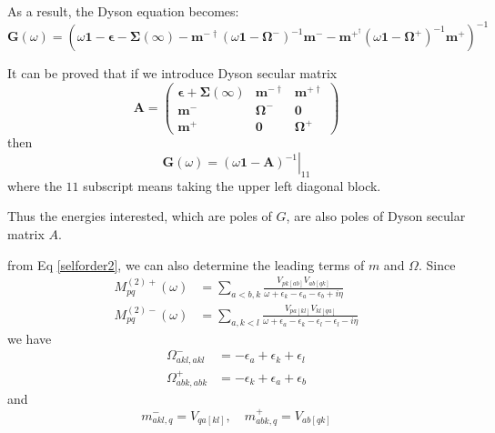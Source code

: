 As a result, the Dyson equation becomes:
\begin{equation}
	\boldsymbol{G}(\omega)=\left(\omega \mathbf{1}-\boldsymbol{\epsilon}-\boldsymbol{\Sigma}(\infty)-\boldsymbol{m}^{-\dagger}\left(\omega \mathbf{1}-\boldsymbol{\Omega}^{-}\right)^{-1} \boldsymbol{m}^{-}-\boldsymbol{m}^{+^{\dagger}}\left(\omega \mathbf{1}-\boldsymbol{\Omega}^{+}\right)^{-1} \boldsymbol{m}^{+}\right)^{-1}
\end{equation}

It can be proved that if we introduce Dyson secular matrix
\begin{equation} \label{matrixA}
	\boldsymbol{A}=\left( \begin{array}{ccc}{\boldsymbol{\epsilon}+\boldsymbol{\Sigma}(\infty)} & {\boldsymbol{m}^{-\dagger}} & {\boldsymbol{m}^{+\dagger}} \\ {\boldsymbol{m}^{-}} & {\boldsymbol{\Omega}^{-}} & {\mathbf{0}} \\ {\boldsymbol{m}^{+}} & {\mathbf{0}} & {\boldsymbol{\Omega}^{+}}\end{array}\right)
\end{equation}
then
\begin{equation}
	\boldsymbol{G}(\omega)=\left.(\omega \mathbf{1}-\boldsymbol{A})^{-1}\right|_{11}
\end{equation}
where the $11$ subscript means taking the upper left diagonal block.

Thus the energies interested, which are poles of $G$, are also poles of Dyson secular matrix $A$.

from Eq \ref{selforder2}, we can also determine the leading terms of $m$ and $\Omega$.
Since 
\begin{equation}
	\begin{aligned} 
	M_{p q}^{(2)+}(\omega) &=\sum_{a<b, k} \frac{V_{p k[a b]} V_{a b[q k]}}{\omega+\epsilon_{k}-\epsilon_{a}-\epsilon_{b}+i \eta}
	\\ 
	M_{p q}^{(2)-}(\omega) &=\sum_{a, k<l} \frac{V_{p a[k l]} V_{k l[q a]}}{\omega+\epsilon_{a}-\epsilon_{k}-\epsilon_{l}-\epsilon_{l}-i \eta}
	\end{aligned}
\end{equation}
we have
\begin{equation}
	\begin{aligned} 
	\Omega_{a k l, a k l}^{-} &=-\epsilon_{a}+\epsilon_{k}+\epsilon_{l}
	\\ 
	\Omega_{a b k, a b k}^{+} &=-\epsilon_{k}+\epsilon_{a}+\epsilon_{b} 
	\end{aligned}
\end{equation}
and
\begin{equation} 
	m_{a k l, q}^{-} =V_{q a[k l]}, \quad m_{a b k, q}^{+}=V_{a b[q k]}
\end{equation}

